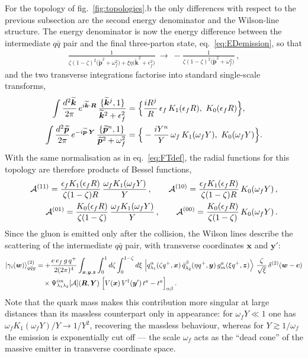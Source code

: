 \documentclass[11pt,a4paper]{article}
\newcommand{\ket}[1]{\left|#1\right\rangle}
\newcommand{\calA}{\mathcal{A}}
\newcommand{\vx}{\bm{x}}
\newcommand{\vy}{\bm{y}}
\newcommand{\vz}{\bm{z}}
\newcommand{\vw}{\bm{w}}
\newcommand{\vc}{\bm{c}}
\newcommand{\vR}{\bm{R}}
\newcommand{\vY}{\bm{Y}}
\newcommand{\kt}{\widetilde{\bm{k}}}
\newcommand{\pt}{\widetilde{\bm{p}}}
\newcommand{\eps}{\epsilon}
\numberwithin{equation}{section}
\begin{document}
For the topology of fig.~\ref{fig:topologies}.b the only differences with respect to the
previous subsection are the second energy denominator and the Wilson-line structure. The
energy denominator is now the energy difference between the intermediate $q\bar q$ pair and the
final three-parton state, eq.~\eqref{eq:EDemission}, so that
\begin{align}
\frac{1}{\zeta(1-\zeta)^{2}\big(\pt^{2}+\omega^{2}_{f}\big)+\xi\eta\big(\kt^{2}+\eps_{f}^{2}\big)}
\ \longrightarrow\
-\frac{1}{\zeta(1-\zeta)^{2}\big(\pt^{2}+\omega^{2}_{f}\big)}\,,
\end{align}
and the two transverse integrations factorise into standard single-scale transforms,
\begin{align}
\int \frac{d^{2}\kt}{2\pi}\, e^{i\kt\cdot \vR}\,
\frac{\{\kt^{j},1\}}{\kt^{2}+\eps^{2}_{f}}
&= \Big\{\frac{i R^{j}}{R}\,\eps_{f}\,K_{1}(\eps_{f}R),\ K_{0}(\eps_{f} R)\Big\},\notag\\
\int \frac{d^{2}\pt}{2\pi}\, e^{-i\pt\cdot \vY}\,
\frac{\{\pt^{n},1\}}{\pt^{2}+\omega^{2}_{f}}
&= \Big\{-\frac{i Y^{n}}{Y}\,\omega_{f}\,K_{1}(\omega_{f}Y),\ K_{0}(\omega_{f} Y)\Big\}.
\end{align}
With the same normalisation as in eq.~\eqref{eq:FTdef}, the radial functions for this topology
are therefore products of Bessel functions,
\begin{align}
\label{eq:Aab}
\calA^{(11)} = \frac{\eps_{f}K_{1}(\eps_{f} R)}{\zeta(1-\zeta)R}\,
\frac{\omega_{f}K_{1}(\omega_{f}Y)}{Y}\,,\qquad
\calA^{(10)} = \frac{\eps_{f}K_{1}(\eps_{f}R)}{\zeta(1-\zeta)R}\, K_{0}(\omega_{f}Y)\,,\notag\\
\calA^{(01)} = \frac{K_{0}(\eps_{f}R)}{\zeta(1-\zeta)}\,
\frac{\omega_{f}K_{1}(\omega_{f}Y)}{Y}\,,\qquad
\calA^{(00)} = \frac{K_{0}(\eps_{f}R)}{\zeta(1-\zeta)}\,K_{0}(\omega_{f}Y)\,.
\end{align}
Since the gluon is emitted only after the collision, the Wilson lines describe the scattering
of the intermediate $q\bar q$ pair, with transverse coordinates $\vx$ and $\vy'$:
\begin{align}
\label{eq:wf2}
\ket{\gamma_i(\vw)}^{(2)}_{q\bar{q}g} &= +\frac{e\,e_{f}\,g\,q^{+}}{2(2\pi)^{4}}
\int_{\vx,\vy,\vz} \int_{0}^{1} d\zeta \int_{0}^{1-\zeta} d\xi\,
\ket{q^{\alpha}_{\lambda_{1}}(\zeta q^{+},\vx)\,\bar{q}^{\beta}_{\lambda_{2}}(\eta q^{+},\vy)\,
g^{a}_{m}(\xi q^{+},\vz)}\, \frac{\zeta}{\sqrt{\xi}}\, \delta^{(2)}(\vw-\vc) \notag\\
&\quad\times \Psi^{im}_{\lambda_{1}\lambda_{2}}[\calA](\vR,\vY)\;
\Big[V(\vx)\,V^{\dagger}(\vy')\,t^{a}-t^{a}\Big]_{\alpha\beta}\,.
\end{align}
Note that the quark mass makes this contribution more singular at large distances than its
massless counterpart only in appearance: for $\omega_f Y\ll 1$ one has $\omega_f
K_1(\omega_fY)/Y\to 1/Y^2$, recovering the massless behaviour, whereas for $Y\gtrsim
1/\omega_f$ the emission is exponentially cut off --- the scale $\omega_f$ acts as the ``dead
cone'' of the massive emitter in transverse coordinate space.
\end{document}
